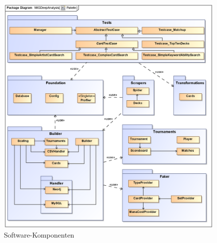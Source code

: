 \begin{figure}[t]
    \myfloatalign
    \includegraphics[width=\textwidth]{gfx/sw-components.eps}
    \caption{Software-Komponenten}
    \label{fig:sw-components}
\end{figure}

